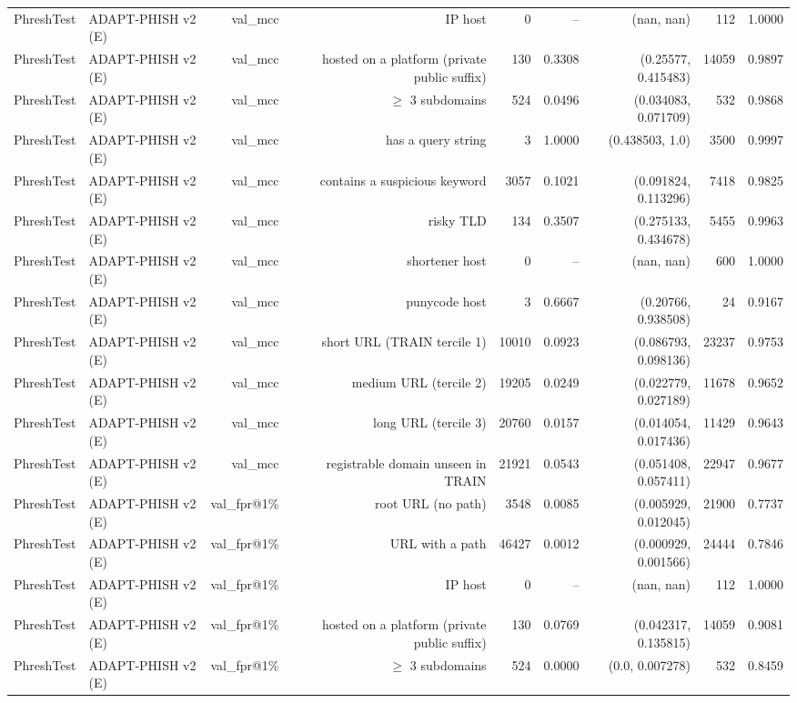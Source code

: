 \begin{table}[t]
\begin{tabular}{llrrrrrrr}
PhreshTest & ADAPT-PHISH v2 (E) & val\_mcc & IP host & 0 & -- & (nan, nan) & 112 & 1.0000 \\
PhreshTest & ADAPT-PHISH v2 (E) & val\_mcc & hosted on a platform (private public suffix) & 130 & 0.3308 & (0.25577, 0.415483) & 14059 & 0.9897 \\
PhreshTest & ADAPT-PHISH v2 (E) & val\_mcc & $\geq$ 3 subdomains & 524 & 0.0496 & (0.034083, 0.071709) & 532 & 0.9868 \\
PhreshTest & ADAPT-PHISH v2 (E) & val\_mcc & has a query string & 3 & 1.0000 & (0.438503, 1.0) & 3500 & 0.9997 \\
PhreshTest & ADAPT-PHISH v2 (E) & val\_mcc & contains a suspicious keyword & 3057 & 0.1021 & (0.091824, 0.113296) & 7418 & 0.9825 \\
PhreshTest & ADAPT-PHISH v2 (E) & val\_mcc & risky TLD & 134 & 0.3507 & (0.275133, 0.434678) & 5455 & 0.9963 \\
PhreshTest & ADAPT-PHISH v2 (E) & val\_mcc & shortener host & 0 & -- & (nan, nan) & 600 & 1.0000 \\
PhreshTest & ADAPT-PHISH v2 (E) & val\_mcc & punycode host & 3 & 0.6667 & (0.20766, 0.938508) & 24 & 0.9167 \\
PhreshTest & ADAPT-PHISH v2 (E) & val\_mcc & short URL (TRAIN tercile 1) & 10010 & 0.0923 & (0.086793, 0.098136) & 23237 & 0.9753 \\
PhreshTest & ADAPT-PHISH v2 (E) & val\_mcc & medium URL (tercile 2) & 19205 & 0.0249 & (0.022779, 0.027189) & 11678 & 0.9652 \\
PhreshTest & ADAPT-PHISH v2 (E) & val\_mcc & long URL (tercile 3) & 20760 & 0.0157 & (0.014054, 0.017436) & 11429 & 0.9643 \\
PhreshTest & ADAPT-PHISH v2 (E) & val\_mcc & registrable domain unseen in TRAIN & 21921 & 0.0543 & (0.051408, 0.057411) & 22947 & 0.9677 \\
PhreshTest & ADAPT-PHISH v2 (E) & val\_fpr@1\% & root URL (no path) & 3548 & 0.0085 & (0.005929, 0.012045) & 21900 & 0.7737 \\
PhreshTest & ADAPT-PHISH v2 (E) & val\_fpr@1\% & URL with a path & 46427 & 0.0012 & (0.000929, 0.001566) & 24444 & 0.7846 \\
PhreshTest & ADAPT-PHISH v2 (E) & val\_fpr@1\% & IP host & 0 & -- & (nan, nan) & 112 & 1.0000 \\
PhreshTest & ADAPT-PHISH v2 (E) & val\_fpr@1\% & hosted on a platform (private public suffix) & 130 & 0.0769 & (0.042317, 0.135815) & 14059 & 0.9081 \\
PhreshTest & ADAPT-PHISH v2 (E) & val\_fpr@1\% & $\geq$ 3 subdomains & 524 & 0.0000 & (0.0, 0.007278) & 532 & 0.8459 \\

\end{tabular}
\end{table}

